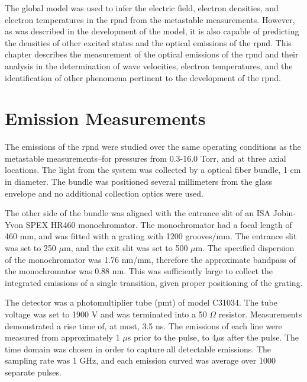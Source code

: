 The global model was used to infer the electric field, electron densities, and
electron temperatures in the \acs{rpnd} from the metastable measurements.
However, as was described in the development of the model, it is also capable of
predicting the densities of other excited states and the optical emissions of
the \acs{rpnd}. This chapter describes the measurement of the optical emissions
of the \acs{rpnd} and their analysis in the determination of wave velocities,
electron temperatures, and the identification of other phenomena pertinent to
the development of the \acs{rpnd}.

\section{Emission Measurements}

The emissions of the \acs{rpnd} were studied over the same operating conditions
as the metastable measurements--for pressures from 0.3-16.0 Torr, and at three
axial locations. The light from the system was collected by a optical fiber
bundle, 1 cm in diameter. The bundle was positioned several millimeters from the
glass envelope and no additional collection optics were used.

The other side of the bundle was aligned with the entrance slit of an ISA
Jobin-Yvon SPEX HR460 monochromator. The monochromator had a focal length of 460
mm, and was fitted with a grating with 1200 grooves/mm. The entrance slit was
set to 250 $\mu$m, and the exit slit was set to 500 $\mu$m. The specified
dispersion of the monochromator was 1.76 nm/mm, therefore the approximate
bandpass of the monochromator was 0.88 nm. This was sufficiently large to
collect the integrated emissions of a single transition, given proper
positioning of the grating.

The detector was a photomultiplier tube (\acs{pmt}) of model C31034. The tube
voltage was set to 1900 V and was terminated into a 50 $\Omega$ resistor.
Measurements demonstrated a rise time of, at most, 3.5 ns. The emissions of each
line were measured from approximately 1 $\mu$s prior to the pulse, to 4$\mu$s
after the pulse. The time domain was chosen in order to capture all detectable
emissions. The sampling rate was 1 GHz, and each emission curved was average
over 1000 separate pulses.

